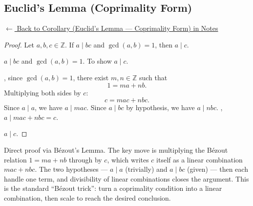 
\subsection*{Euclid's Lemma (Coprimality Form)}
\label{prf:euclids-lemma-coprimality}

\begin{remark*}[Return]
\hyperref[cor:euclids-lemma-coprimality]{$\leftarrow$ Back to Corollary
(Euclid's Lemma --- Coprimality Form) in Notes}
\end{remark*}

\begin{proof}
\Claim Let $a, b, c \in \mathbb{Z}$. If $a \mid bc$ and $\gcd(a,b) = 1$,
then $a \mid c$.

\Given $a \mid bc$ and $\gcd(a,b) = 1$.
\Goal To show $a \mid c$.

, since $\gcd(a,b) = 1$, there exist $m, n \in \mathbb{Z}$
such that
\[
    1 = ma + nb.
\]
Multiplying both sides by $c$:
\[
    c = mac + nbc.
\]
Since $a \mid a$, we have $a \mid mac$.
Since $a \mid bc$ by hypothesis, we have $a \mid nbc$.
, $a \mid mac + nbc = c$.

\Hence $a \mid c$. \AsReq
\end{proof}

\begin{remark*}
Direct proof via Bézout's Lemma. The key move is multiplying the
Bézout relation $1 = ma + nb$ through by $c$, which writes $c$ itself
as a linear combination $mac + nbc$. The two hypotheses — $a \mid a$
(trivially) and $a \mid bc$ (given) — then each handle one term,
and divisibility of linear combinations closes the argument.
This is the standard ``Bézout trick'': turn a coprimality condition
into a linear combination, then scale to reach the desired conclusion.

\end{remark*}

